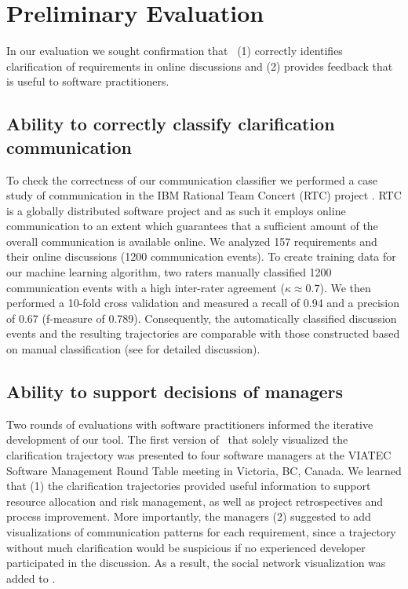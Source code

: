 \section{Preliminary Evaluation}
In our evaluation we sought confirmation that \viss\ (1) correctly identifies clarification of requirements in online discussions and (2) provides feedback that is useful to software practitioners. 

\subsection{Ability to correctly classify clarification communication}
To check the correctness of our communication classifier we performed a case study of communication in the IBM Rational Team Concert (RTC) project \cite{Knauss2012f}. 
RTC is a globally distributed software project and as such it employs online communication to an extent which guarantees that a sufficient amount of the overall communication is available online.
%
%
We analyzed 157 requirements and their online discussions (1200 communication events). 
To create training data for our machine learning algorithm, two raters manually classified 1200 communication events with a high inter-rater agreement ($\kappa \approx 0.7$).  
We then performed a 10-fold cross validation and measured a recall of 0.94 and a precision of  0.67 (f-measure of 0.789). 
Consequently, the automatically classified discussion events and the resulting trajectories are comparable with those constructed based on manual classification (see \cite{Knauss2012f} for detailed discussion).

\subsection{Ability to support decisions of managers}
Two rounds of evaluations with software practitioners informed the iterative development of our tool. 
The first version of \viss\ that solely visualized the clarification trajectory was presented to four software managers at the VIATEC Software Management Round Table meeting in Victoria, BC, Canada. 
We learned that (1) the clarification trajectories provided useful information to support resource allocation and risk management, as well as project retrospectives and process improvement.
More importantly, the managers (2) suggested to add visualizations of communication patterns for each requirement, since a trajectory without much clarification would be suspicious if no experienced developer participated in the discussion. 
As a result, the social network visualization was added to \viss. 


